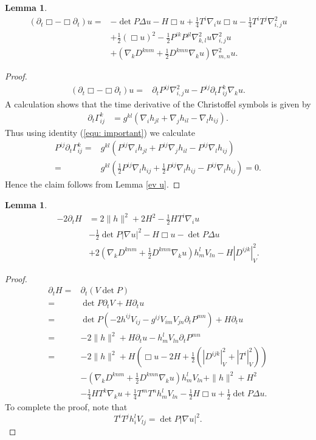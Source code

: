 \documentclass{amsart}
\newtheorem{lemma}[theorem]{Lemma}
\theoremstyle{definition}
\theoremstyle{remark}
\numberwithin{equation}{section}
\begin{document}
\begin{lemma}
\begin{align*}
(\partial_t \Box-\Box\partial_t) u=
&-\det P\Delta u-H\Box u+\frac{1}{4}T^i\nabla_iu\Box u-\frac{1}{4}T^iT^j\nabla^2_{i,j}u\\
&+\frac{1}{2}(\Box u)^2-\frac{1}{2}P^{ik}P^{jl}\nabla^2_{k,l}u\nabla^2_{i,j}u\\
&+\left(\nabla_kD^{knm}+\frac{1}{2}D^{kmn}\nabla_ku\right)\nabla^2_{m,n}u.
\end{align*}
\end{lemma}
\begin{proof}
\begin{align*}
(\partial_t \Box-\Box \partial_t)u
=&\partial_tP^{ij}\nabla^2_{i,j}u-P^{ij}\partial_t\Gamma_{ij}^k\nabla_ku.
\end{align*}
A calculation shows that the time derivative of the Christoffel symbols is given by
\begin{align*}
\partial_t \Gamma_{ij}^k&=g^{kl}\left(\nabla_ih_{jl}+\nabla_jh_{il}-\nabla_{l}h_{ij}\right).
\end{align*}
Thus using identity (\ref{equ: important}) we calculate
\begin{align*}
P^{ij}\partial_t \Gamma_{ij}^k=&g^{kl}\left(P^{ij}\nabla_ih_{jl}+P^{ij}\nabla_jh_{il}-P^{ij}\nabla_{l}h_{ij}\right)\\
=&g^{kl}\left(\frac{1}{2}P^{ij}\nabla_lh_{ij}+\frac{1}{2}P^{ij}\nabla_lh_{ij}-P^{ij}\nabla_{l}h_{ij}\right)=0.
\end{align*}
Hence the claim follows from Lemma \ref{ev u}.
\end{proof}
\begin{lemma}
\begin{align*}
-2\partial_tH&=2\|h\|^2+2H^2-\frac{1}{2}HT^i\nabla_iu
\\&-\frac{1}{2}\det P |\nabla u|^2
-H\Box u-\det P\Delta u\\
&+2\left(\nabla_kD^{knm}+\frac{1}{2}D^{kmn}\nabla_ku\right)h_m^lV_{ln}
-H\left|D^{ijk}\right|_V^2.
\end{align*}
\end{lemma}
\begin{proof}
\begin{align*}
\partial_tH=&\partial_t(V\det P)\\
=&\det P\partial_t V+H\partial_tu\\
=&\det P(-2h^{ij}V_{ij}-g^{ij}V_{im}V_{jn}\partial_tP^{mn})+H\partial_tu\\
=&-2\|h\|^2+H\partial_tu-h_m^lV_{ln}\partial_tP^{mn}\\
=&-2\|h\|^2+H\left(\Box u-2H+\frac{1}{2}\left(\left|D^{ijk}\right|^2_V+\left|T^i\right|_V^2\right)\right)\\
&-\left(\nabla_kD^{knm}+\frac{1}{2}D^{kmn}\nabla_ku\right)h_m^lV_{ln}+\|h\|^2+H^2\\
&-\frac{1}{4}HT^k\nabla_ku+\frac{1}{4}T^mT^nh_m^lV_{ln}-\frac{1}{2}H\Box u+\frac{1}{2}\det P\Delta u.
\end{align*}
To complete the proof, note that
\[T^iT^jh_i^lV_{lj}=\det P|\nabla u|^2.\]
\end{proof}
\end{document}
